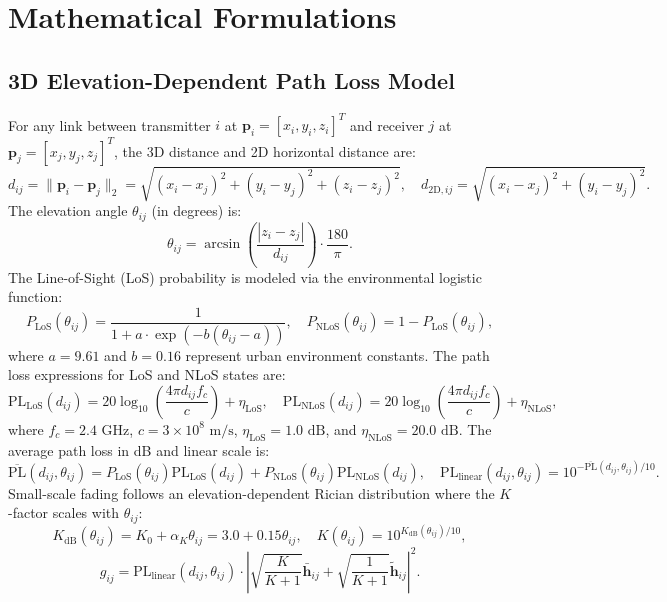 \documentclass[journal,onecolumn]{IEEEtran}
\begin{document}
\section{Mathematical Formulations}

\subsection{3D Elevation-Dependent Path Loss Model}
For any link between transmitter $i$ at $\mathbf{p}_i = [x_i, y_i, z_i]^T$ and receiver $j$ at $\mathbf{p}_j = [x_j, y_j, z_j]^T$, the 3D distance and 2D horizontal distance are:
\begin{equation}
    d_{ij} = \|\mathbf{p}_i - \mathbf{p}_j\|_2 = \sqrt{(x_i - x_j)^2 + (y_i - y_j)^2 + (z_i - z_j)^2}, \quad d_{\text{2D}, ij} = \sqrt{(x_i - x_j)^2 + (y_i - y_j)^2}.
\end{equation}
The elevation angle $\theta_{ij}$ (in degrees) is:
\begin{equation}
    \theta_{ij} = \arcsin\left( \frac{|z_i - z_j|}{d_{ij}} \right) \cdot \frac{180}{\pi}.
\end{equation}
The Line-of-Sight (LoS) probability is modeled via the environmental logistic function:
\begin{equation}
    P_{\text{LoS}}(\theta_{ij}) = \frac{1}{1 + a \cdot \exp\left( -b (\theta_{ij} - a) \right)}, \quad P_{\text{NLoS}}(\theta_{ij}) = 1 - P_{\text{LoS}}(\theta_{ij}),
\end{equation}
where $a = 9.61$ and $b = 0.16$ represent urban environment constants. The path loss expressions for LoS and NLoS states are:
\begin{equation}
    \text{PL}_{\text{LoS}}(d_{ij}) = 20\log_{10}\left( \frac{4\pi d_{ij} f_c}{c} \right) + \eta_{\text{LoS}}, \quad
    \text{PL}_{\text{NLoS}}(d_{ij}) = 20\log_{10}\left( \frac{4\pi d_{ij} f_c}{c} \right) + \eta_{\text{NLoS}},
\end{equation}
where $f_c = 2.4\text{ GHz}$, $c = 3 \times 10^8\text{ m/s}$, $\eta_{\text{LoS}} = 1.0\text{ dB}$, and $\eta_{\text{NLoS}} = 20.0\text{ dB}$. The average path loss in dB and linear scale is:
\begin{equation}
    \overline{\text{PL}}(d_{ij}, \theta_{ij}) = P_{\text{LoS}}(\theta_{ij}) \text{PL}_{\text{LoS}}(d_{ij}) + P_{\text{NLoS}}(\theta_{ij}) \text{PL}_{\text{NLoS}}(d_{ij}), \quad
    \text{PL}_{\text{linear}}(d_{ij}, \theta_{ij}) = 10^{-\overline{\text{PL}}(d_{ij}, \theta_{ij}) / 10}.
\end{equation}
Small-scale fading follows an elevation-dependent Rician distribution where the $K$-factor scales with $\theta_{ij}$:
\begin{equation}
    K_{\text{dB}}(\theta_{ij}) = K_0 + \alpha_K \theta_{ij} = 3.0 + 0.15 \theta_{ij}, \quad K(\theta_{ij}) = 10^{K_{\text{dB}}(\theta_{ij}) / 10},
\end{equation}
\begin{equation}
    g_{ij} = \text{PL}_{\text{linear}}(d_{ij}, \theta_{ij}) \cdot \left| \sqrt{\frac{K}{K+1}} \bar{\mathbf{h}}_{ij} + \sqrt{\frac{1}{K+1}} \tilde{\mathbf{h}}_{ij} \right|^2.
\end{equation}
\end{document}
